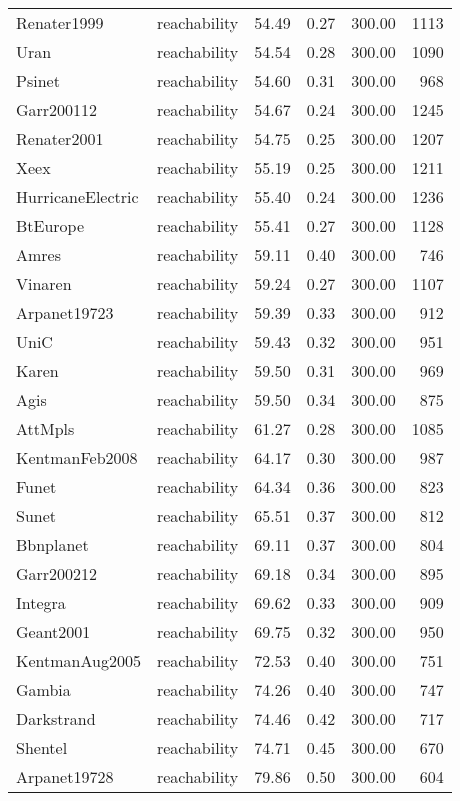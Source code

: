 \begin{tabular}{llrrrr}
Renater1999 & reachability & 54.49 & 0.27 & 300.00 & 1113 \\
Uran & reachability & 54.54 & 0.28 & 300.00 & 1090 \\
Psinet & reachability & 54.60 & 0.31 & 300.00 & 968 \\
Garr200112 & reachability & 54.67 & 0.24 & 300.00 & 1245 \\
Renater2001 & reachability & 54.75 & 0.25 & 300.00 & 1207 \\
Xeex & reachability & 55.19 & 0.25 & 300.00 & 1211 \\
HurricaneElectric & reachability & 55.40 & 0.24 & 300.00 & 1236 \\
BtEurope & reachability & 55.41 & 0.27 & 300.00 & 1128 \\
Amres & reachability & 59.11 & 0.40 & 300.00 & 746 \\
Vinaren & reachability & 59.24 & 0.27 & 300.00 & 1107 \\
Arpanet19723 & reachability & 59.39 & 0.33 & 300.00 & 912 \\
UniC & reachability & 59.43 & 0.32 & 300.00 & 951 \\
Karen & reachability & 59.50 & 0.31 & 300.00 & 969 \\
Agis & reachability & 59.50 & 0.34 & 300.00 & 875 \\
AttMpls & reachability & 61.27 & 0.28 & 300.00 & 1085 \\
KentmanFeb2008 & reachability & 64.17 & 0.30 & 300.00 & 987 \\
Funet & reachability & 64.34 & 0.36 & 300.00 & 823 \\
Sunet & reachability & 65.51 & 0.37 & 300.00 & 812 \\
Bbnplanet & reachability & 69.11 & 0.37 & 300.00 & 804 \\
Garr200212 & reachability & 69.18 & 0.34 & 300.00 & 895 \\
Integra & reachability & 69.62 & 0.33 & 300.00 & 909 \\
Geant2001 & reachability & 69.75 & 0.32 & 300.00 & 950 \\
KentmanAug2005 & reachability & 72.53 & 0.40 & 300.00 & 751 \\
Gambia & reachability & 74.26 & 0.40 & 300.00 & 747 \\
Darkstrand & reachability & 74.46 & 0.42 & 300.00 & 717 \\
Shentel & reachability & 74.71 & 0.45 & 300.00 & 670 \\
Arpanet19728 & reachability & 79.86 & 0.50 & 300.00 & 604 \\

\end{tabular}

